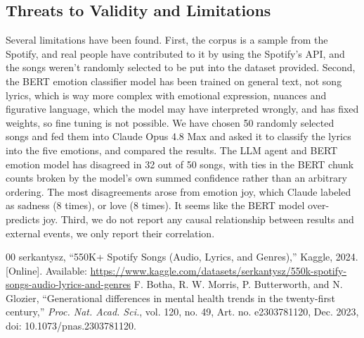 \documentclass[conference]{IEEEtran}
\begin{document}
\subsection{Threats to Validity and Limitations}
Several limitations have been found. First, the corpus is a sample
from the Spotify, and real people have contributed to it by
using the Spotify's API, and the songs weren't randomly selected to
be put into the dataset provided. Second, the BERT emotion classifier model
has been trained on general text, not song lyrics, which is way more complex
with emotional expression, nuances and figurative language, which the model may
have interpreted wrongly, and has fixed weights, so fine tuning is not possible.
We have chosen 50 randomly selected songs and fed them into Claude Opus 4.8 Max
and asked it to classify the lyrics into the five emotions, and compared the results.
The LLM agent and BERT emotion model has disagreed in 32 out of 50 songs,
with ties in the BERT chunk counts broken by the model's own summed confidence
rather than an arbitrary ordering. The most disagreements arose from emotion joy,
which Claude labeled as sadness (8 times), or love (8 times). It seems like the
BERT model over-predicts joy. Third, we do not report any causal relationship 
between results and external events, we only report their correlation.

\begin{thebibliography}{00}
 serkantysz, ``550K+ Spotify Songs (Audio, Lyrics, and Genres),'' Kaggle, 2024. [Online]. Available: \url{https://www.kaggle.com/datasets/serkantysz/550k-spotify-songs-audio-lyrics-and-genres}
 F. Botha, R. W. Morris, P. Butterworth, and N. Glozier, ``Generational differences in mental health trends in the twenty-first century,'' \textit{Proc. Nat. Acad. Sci.}, vol. 120, no. 49, Art. no. e2303781120, Dec. 2023, doi: 10.1073/pnas.2303781120.
\end{thebibliography}
\end{document}
